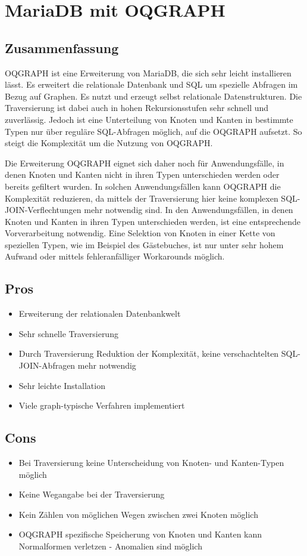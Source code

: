 \section{MariaDB mit OQGRAPH}%
\subsection{Zusammenfassung}
OQGRAPH ist eine Erweiterung von MariaDB, die sich sehr leicht installieren lässt. Es erweitert die relationale Datenbank und SQL um spezielle Abfragen im Bezug auf Graphen. Es nutzt und erzeugt selbst relationale Datenstrukturen. Die Traversierung ist dabei auch in hohen Rekursionsstufen sehr schnell und zuverlässig. Jedoch ist eine Unterteilung von Knoten und Kanten in bestimmte Typen nur über reguläre SQL-Abfragen möglich, auf die OQGRAPH aufsetzt. So steigt die Komplexität um die Nutzung von OQGRAPH.

Die Erweiterung OQGRAPH eignet sich daher noch für Anwendungsfälle, in denen Knoten und Kanten nicht in ihren Typen unterschieden werden oder bereits gefiltert wurden. In solchen Anwendungsfällen kann OQGRAPH die Komplexität reduzieren, da mittels der Traversierung hier keine komplexen SQL-JOIN-Verflechtungen mehr notwendig sind. In den Anwendungsfällen, in denen Knoten und Kanten in ihren Typen unterschieden werden, ist eine entsprechende Vorverarbeitung notwendig. Eine Selektion von Knoten in einer Kette von speziellen Typen, wie im Beispiel des Gästebuches, ist nur unter sehr hohem Aufwand oder mittels fehleranfälliger Workarounds möglich.

\subsection{Pros}
\begin{itemize}
	\setlength\itemsep{-0.5em}
	\item Erweiterung der relationalen Datenbankwelt
	\item Sehr schnelle Traversierung
	\item Durch Traversierung Reduktion der Komplexität, keine verschachtelten SQL-JOIN-Abfragen mehr notwendig
	\item Sehr leichte Installation
	\item Viele graph-typische Verfahren implementiert
\end{itemize}

\subsection{Cons}
\begin{itemize}
	\setlength\itemsep{-0.5em}
	\item Bei Traversierung keine Unterscheidung von Knoten- und Kanten-Typen möglich
	\item Keine Wegangabe bei der Traversierung
	\item Kein Zählen von möglichen Wegen zwischen zwei Knoten möglich
	\item OQGRAPH spezifische Speicherung von Knoten und Kanten kann Normalformen verletzen - Anomalien sind möglich
\end{itemize}